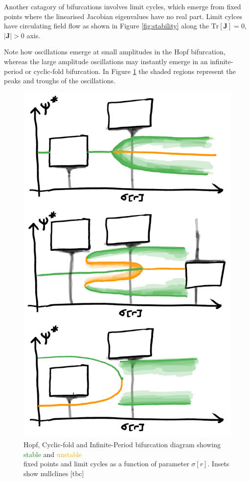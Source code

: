 \documentclass{article}[12pt]
\numberwithin{equation}{section}
\begin{document}
Another catagory of bifurcations involves limit cycles, which emerge from fixed
points where the linearised Jacobian eigenvalues have no real part. Limit cylces
have circulating field flow as shown in Figure \ref{fig:stability} along the
$\mathrm{Tr}[\mathbf{J}]=0$, $|\mathbf{J}|>0$ axis.

Note how oscillations emerge at small amplitudes in the Hopf bifurcation,
whereas the large amplitude oscillations may instantly emerge in an infinite-period
or cyclic-fold bifurcation. In Figure \ref{fig:limitcycles} the shaded regions
represent the peaks and troughs of the oscillations.
\begin{figure}[H]
\centering{}
\captionsetup{justification=centering}
\includegraphics[scale=0.35]{figures/limitcycles}
\caption{Hopf, Cyclic-fold and Infinite-Period bifurcation diagram showing
\textcolor{Green}{stable} and \textcolor{orange}{unstable}\\ fixed points
and limit cycles as a function of parameter $\sigma[r]$.
Insets show nullclines [tbc]}
\label{fig:limitcycles}
\end{figure}
\end{document}
